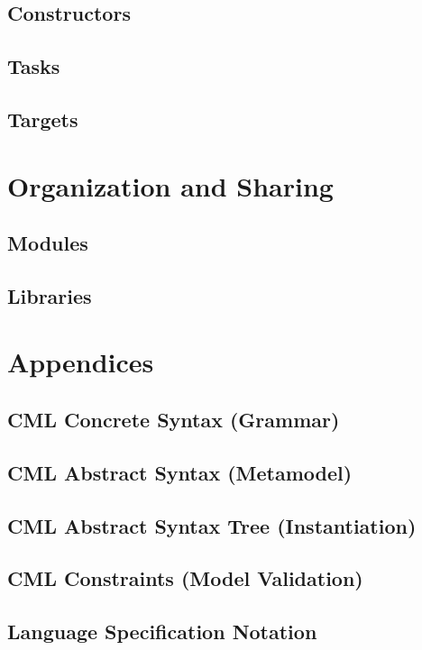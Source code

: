 \documentclass[a4paper,oneside,12pt, extrafontsizes]{memoir}
\begin{document}
  \chapter{Constructors}
  \label{sec:constructors}

  \chapter{Tasks}
  \label{sec:tasks}

  \chapter{Targets}
  \label{sec:targets}

\part{Organization and Sharing}

  \chapter{Modules}
  \label{ch:modules}

  \chapter{Libraries}
  \label{ch:libraries}

\part{Appendices}

\appendix

  \chapter{CML Concrete Syntax (Grammar)}
  \label{apx:concrete-syntax}
  

  \chapter{CML Abstract Syntax (Metamodel)}
  \label{apx:abstract-syntax}
  

  \chapter{CML Abstract Syntax Tree (Instantiation)}
  \label{apx:ast}
  

  \chapter{CML Constraints (Model Validation)}
  \label{apx:ocl}
  

  \chapter{Language Specification Notation}
  \label{apx:lsl}
  

\backmatter



\end{document}
